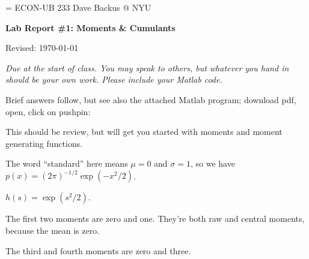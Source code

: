 \documentclass[11pt]{exam}
\begin{document}
\parskip=\bigskipamount
\parindent=0.0in
\thispagestyle{empty}
{\large ECON-UB 233 \hfill Dave Backus @ NYU}

\bigskip\bigskip
\centerline{\Large \bf Lab Report \#1: Moments \& Cumulants}
\centerline{Revised: \today}

\bigskip
{\it Due at the start of class.
You may speak to others, but whatever you hand in should be your own work.
Please include your Matlab code.}

\begin{questions}

\begin{solution}
Brief answers follow,
but see also the attached Matlab program;
download pdf, open, click on pushpin:
\end{solution}

This should be review, but will get you started with
moments and moment generating functions.
%

\begin{solution}
\begin{parts}
\item The word ``standard'' here means $\mu = 0$ and $\sigma = 1$, so we have
$p(x) = (2\pi)^{-1/2} \exp(-x^2/2) $.
\item $ h(s) = \exp( s^2/2) $.
\item The first two moments are zero and one.
They're both raw and central moments, because the mean is zero.
\item The third and fourth moments are zero and three.
\end{parts}
\end{solution}


\end{questions}
\end{document}
